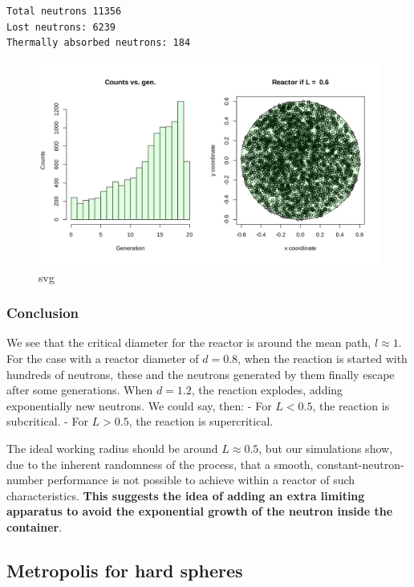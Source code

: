 \documentclass[11pt]{article}
\begin{document}
\begin{verbatim}
Total neutrons 11356 
Lost neutrons: 6239 
Thermally absorbed neutrons: 184 
\end{verbatim}

\begin{figure}
\centering
\includegraphics{output_7_5.svg}
\caption{svg}
\end{figure}

\hypertarget{conclusion}{%
\subsubsection{\texorpdfstring{\textbf{Conclusion}}{Conclusion}}\label{conclusion}}

We see that the critical diameter for the reactor is around the mean
path, \(l\approx 1\). For the case with a reactor diameter of \(d=0.8\),
when the reaction is started with hundreds of neutrons, these and the
neutrons generated by them finally escape after some generations. When
\(d=1.2\), the reaction explodes, adding exponentially new neutrons. We
could say, then: - For \(L<0.5\), the reaction is subcritical. - For
\(L>0.5\), the reaction is supercritical.

The ideal working radius should be around \(L\approx0.5\), but our
simulations show, due to the inherent randomness of the process, that a
smooth, constant-neutron-number performance is not possible to achieve
within a reactor of such characteristics. \textbf{This suggests the idea
of adding an extra limiting apparatus to avoid the exponential growth of
the neutron inside the container}.

\hypertarget{metropolis-for-hard-spheres}{%
\subsection{\texorpdfstring{\textbf{Metropolis for hard
spheres}}{Metropolis for hard spheres}}\label{metropolis-for-hard-spheres}}
\end{document}
